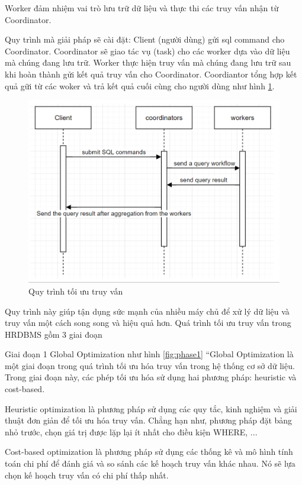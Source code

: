 \documentclass{article}[14pt]
\begin{document}
{Worker đảm nhiệm vai trò lưu trữ dữ liệu và thực thi các truy vấn nhận từ Coordinator. 

Quy trình mà giải pháp sẽ cài đặt: Client (người dùng) gửi sql command cho Coordinator. Coordinator sẽ giao tác vụ (task) cho các worker dựa vào dữ liệu mà chúng đang lưu trữ. Worker thực hiện truy vấn mà chúng đang lưu trữ sau khi hoàn thành gửi kết quả truy vấn cho Coordinator. Coordiantor tổng hợp kết quả gữi từ các woker và trả kết quả cuối cùng cho người dùng như hình \ref{fig:diagramworkflow}.

\begin{figure}[htbp]
\centerline{\includegraphics[scale=.7]{images/diagramworkflow.png}}
\captionsetup{font=Large}
\caption{Quy trình tối ưu truy vấn}
\label{fig:diagramworkflow}
\end{figure}

Quy trình này giúp tận dụng sức mạnh của nhiều máy chủ để xử lý dữ liệu và truy vấn một cách song song và hiệu quả hơn.
Quá trình tối ưu truy vấn trong HRDBMS gồm 3 giai đoạn

Giai đoạn 1 Global Optimization như hình \ref{fig:phase1}
“Global Optimization là một giai đoạn trong quá trình tối ưu hóa truy vấn trong hệ thống cơ sở dữ liệu\cite{arnold2019hrdbms}. Trong giai đoạn này, các phép tối ưu hóa sử dụng hai phương pháp: heuristic và cost-based.

Heuristic optimization là phương pháp sử dụng các quy tắc, kinh nghiệm và giải thuật đơn giản để tối ưu hóa truy vấn. Chẳng hạn như, phương pháp đặt bảng nhỏ trước, chọn giá trị được lặp lại ít nhất cho điều kiện WHERE, ...

Cost-based optimization là phương pháp sử dụng các thống kê và mô hình tính toán chi phí để đánh giá và so sánh các kế hoạch truy vấn khác nhau. Nó sẽ lựa chọn kế hoạch truy vấn có chi phí thấp nhất.

}
\end{document}
